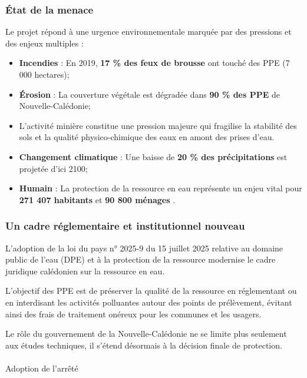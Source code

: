\documentclass[
  11pt,
]{article}
\makeatletter
\let\oldparagraph\paragraph
\renewcommand{\paragraph}{
    \@ifstar
      \xxxParagraphStar
      \xxxParagraphNoStar
  }
\newcommand{\xxxParagraphStar}[1]{\oldparagraph*{#1}\mbox{}}
\newcommand{\xxxParagraphNoStar}[1]{\oldparagraph{#1}\mbox{}}
\providecommand{\tightlist}{%
  \setlength{\itemsep}{0pt}\setlength{\parskip}{0pt}}\usepackage{longtable,booktabs,array}
\makeatother
\begin{document}
\subsubsection{État de la menace}\label{uxe9tat-de-la-menace}

Le projet répond à une urgence environnementale marquée par des
pressions et des enjeux multiples :

\begin{itemize}
\tightlist
\item
  \textbf{Incendies} : En 2019, \textbf{17 \% des feux de brousse} ont
  touché des PPE (7 000 hectares);
\item
  \textbf{Érosion} : La couverture végétale est dégradée dans \textbf{90
  \% des PPE} de Nouvelle-Calédonie;
\item
  L'activité minière constitue une pression majeure qui fragilise la
  stabilité des sols et la qualité physico-chimique des eaux en amont
  des prises d'eau.
\item
  \textbf{Changement climatique} : Une baisse de \textbf{20 \% des
  précipitations} est projetée d'ici 2100;
\item
  \textbf{Humain} : La protection de la ressource en eau représente un
  enjeu vital pour \textbf{271 407 habitants} et \textbf{90 800 ménages}
  .
\end{itemize}

\subsubsection{Un cadre réglementaire et institutionnel
nouveau}\label{un-cadre-ruxe9glementaire-et-institutionnel-nouveau}

L'adoption de la loi du pays n° 2025-9 du 15 juillet 2025 relative au
domaine public de l'eau (DPE) et à la protection de la ressource
modernise le cadre juridique calédonien sur la ressource en eau.

L'objectif des PPE est de préserver la qualité de la ressource en
réglementant ou en interdisant les activités polluantes autour des
points de prélèvement, évitant ainsi des frais de traitement onéreux
pour les communes et les usagers.

Le rôle du gouvernement de la Nouvelle-Calédonie ne se limite plus
seulement aux études techniques, il s'étend désormais à la décision
finale de protection.

\paragraph{Adoption de l'arrêté}\label{adoption-de-larruxeatuxe9}
\end{document}
